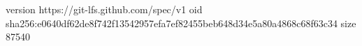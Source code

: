 version https://git-lfs.github.com/spec/v1
oid sha256:e0640df62de8f742f13542957efa7ef82455beb648d34e5a80a4868c68f63c34
size 87540
